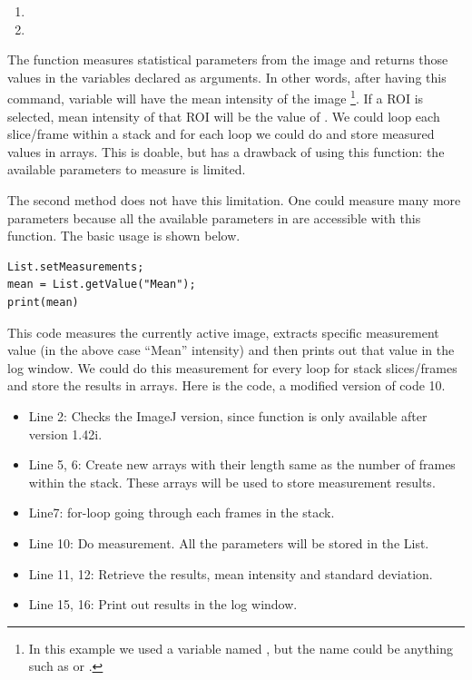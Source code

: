 \begin{enumerate}
\item {}
\item {}
\end{enumerate}
The function  measures statistical parameters from the image and returns those values in the variables declared as arguments. In other words, after having this command, variable  will have the mean intensity of the image
\footnote{In this example we used a variable named , but the name could be anything such as  or .}. 
If a ROI is selected, mean intensity of that ROI will be the value of . We could loop each slice/frame within a stack and for each loop we could do  and store measured values in arrays. This is doable, but has a drawback of using this function: the available parameters to measure is limited. 

The second method  does not have this limitation. One could measure many more parameters because all the available parameters in  are accessible with this function. The basic usage is shown below.

\begin{lstlisting}
List.setMeasurements;
mean = List.getValue("Mean");
print(mean)
\end{lstlisting}

This code measures the currently active image, extracts specific measurement value (in the above case ``Mean'' intensity) and then prints out that value in the log window. We could do this measurement for every loop for stack slices/frames and store the results in arrays. Here is the code, a modified version of code 10. 


\begin{itemize}
  \item Line 2: Checks the ImageJ version, since  function is only available after version 1.42i.
  \item Line 5, 6: Create new arrays with their length same as the number of frames within the stack. These arrays will be used to store measurement results. 
  \item Line7: for-loop going through each frames in the stack.
  \item Line 10: Do measurement. All the parameters will be stored in the List. 
  \item Line 11, 12: Retrieve the results, mean intensity and standard deviation. 
  \item Line 15, 16: Print out results in the log window. 
\end{itemize}

